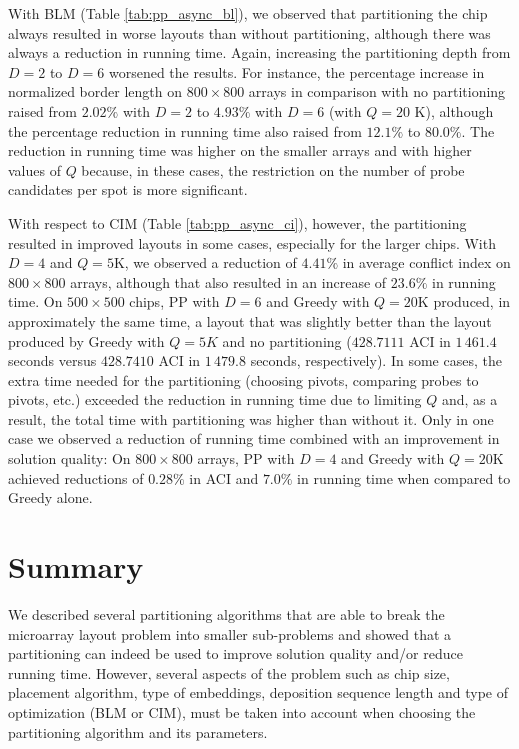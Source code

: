 With BLM (Table \ref{tab:pp_async_bl}), we observed that partitioning the chip
always resulted in worse layouts than without partitioning, although there was
always a reduction in running time. Again, increasing the partitioning depth
from $D=2$ to $D=6$ worsened the results. For instance, the percentage increase
in normalized border length on $800\times 800$ arrays in comparison with no
partitioning raised from $2.02\%$ with $D=2$ to $4.93\%$ with $D=6$ (with $Q=20$
K), although the percentage reduction in running time also raised from $12.1\%$
to $80.0\%$. The reduction in running time was higher on the smaller arrays and
with higher values of $Q$ because, in these cases, the restriction on the number
of probe candidates per spot is more significant.

With respect to CIM (Table \ref{tab:pp_async_ci}), however, the partitioning
resulted in improved layouts in some cases, especially for the larger chips.
With $D=4$ and $Q=5$K, we observed a reduction of $4.41\%$ in average conflict
index on $800\times 800$ arrays, although that also resulted in an increase of
$23.6\%$ in running time. On $500\times 500$ chips, PP with $D=6$ and Greedy
with $Q=20$K produced, in approximately the same time, a layout that was
slightly better than the layout produced by Greedy with $Q=5K$ and no
partitioning ($428.7111$ ACI in $1\,461.4$ seconds versus $428.7410$ ACI in
$1\,479.8$ seconds, respectively). In some cases, the extra time needed for the
partitioning (choosing pivots, comparing probes to pivots, etc.) exceeded the
reduction in running time due to limiting $Q$ and, as a result, the total time
with partitioning was higher than without it. Only in one case we observed a
reduction of running time combined with an improvement in solution quality: On
$800\times 800$ arrays, PP with $D=4$ and Greedy with $Q=20$K achieved
reductions of $0.28\%$ in ACI and $7.0\%$ in running time when compared to
Greedy alone.

\section{Summary}
\label{sec:part_summary}

We described several partitioning algorithms that are able to break the
microarray layout problem into smaller sub-problems and showed that a
partitioning can indeed be used to improve solution quality and/or reduce
running time. However, several aspects of the problem such as chip size,
placement algorithm, type of embeddings, deposition sequence length and type of
optimization (BLM or CIM), must be taken into account when choosing the
partitioning algorithm and its parameters.

